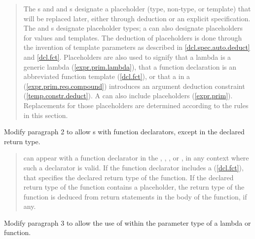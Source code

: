 \begin{quote}
\pnum
The s  and 
and s designate a placeholder
(type, non-type, or template) that will be replaced later, either through 
deduction or an explicit specification.
%
The  and  s 
designate placeholder types; a  can 
also designate placeholders for values and templates. 
% 
\enternote
The deduction of placeholders is done through the invention of template
parameters as described in \ref{dcl.spec.auto.deduct} and \ref{dcl.fct}.
\exitnote
%
Placeholders are also used to signify that a lambda is a generic lambda 
(\ref{expr.prim.lambda}), that a function declaration is an
abbreviated function template (\ref{dcl.fct}), or that a 
 in a 
(\ref{expr.prim.req.compound}) introduces an argument deduction constraint 
(\ref{temp.constr.deduct}).
%
\enternote
A  can also include placeholders (\ref{expr.prim}).
Replacements for those placeholders are determined according to the rules
in this section.
\exitnote
% 
\end{quote}


Modify paragraph 2 to allow s
with function declarators, except in the declared return type.

\begin{quote}
\pnum
{} can appear with a function 
declarator in the , ,
, or , 
in any context where such a declarator is valid. 
% 
If the function declarator includes a  
(\ref{dcl.fct}), that specifies the declared return type of the function.
% 
If the declared return type of the function contains a placeholder, the 
return type of the function is deduced from return statements in the body of 
the function, if any.
%
\end{quote}


Modify paragraph 3 to allow the use of  within the 
parameter type of a lambda or function.

